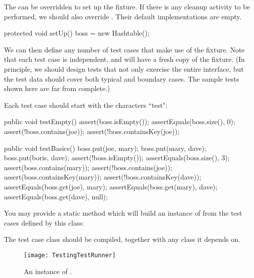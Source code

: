 \documentclass[a4paper,10pt,twoside]{book}
\begin{document}
The   can be overridden to set up the fixture. If there is any cleanup activity to be performed, we should also override . Their default implementations are empty.

\begin{code}
	protected void setUp() {
		boss = new Hashtable();
	}
\end{code}

We can then define any number of test cases that make use of the fixture. Note that each test case is independent, and will have a fresh copy of the fixture. (In principle, we should design tests that not only exercise the entire interface, but the test data should cover both typical and boundary cases. The sample tests shown here are far from complete.) 

Each test case should start with the characters ``test":

\begin{code}
	public void testEmpty() {
		assert(boss.isEmpty());
		assertEquals(boss.size(), 0);
		assert(!boss.contains(joe));
		assert(!boss.containsKey(joe));
	}

	public void testBasics() {
		boss.put(joe, mary);
		boss.put(mary, dave);
		boss.put(boris, dave);
		assert(!boss.isEmpty());
		assertEquals(boss.size(), 3);
		assert(boss.contains(mary));
		assert(!boss.contains(joe));
		assert(boss.containsKey(mary));
		assert(!boss.containsKey(dave));
		assertEquals(boss.get(joe), mary);
		assertEquals(boss.get(mary), dave);
		assertEquals(boss.get(dave), null);
	}
\end{code}

You may provide a static method  which will build an instance of  from the test cases defined by this class:

\begin{code}
	public static TestSuite suite() {
		TestSuite suite = new TestSuite();
		suite.addTest(new TestHashtable("testBasics"));
		suite.addTest(new TestHashtable("testEmpty"));
		return suite;
	}
}
\end{code}

The test case class should be compiled, together with any class it depends on.

\begin{figure}
\begin{center}
\texttt{[image: TestingTestRunner]}
\caption{An instance of .}
\end{center}
\end{figure}
\end{document}
